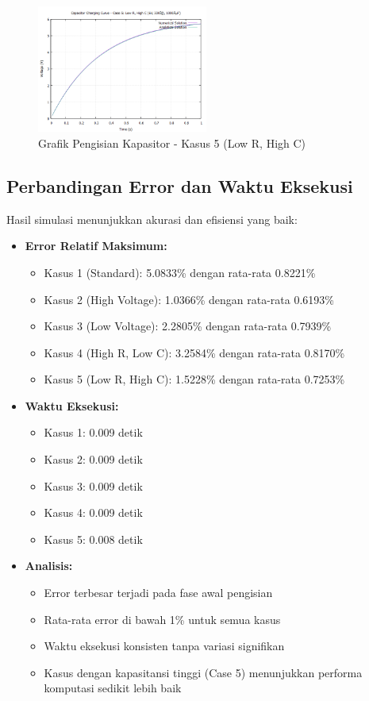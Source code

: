 \documentclass[conference]{IEEEtran}
\begin{document}
\begin{figure}[H]
    \centering
    \includegraphics[width=0.5\textwidth]{Grafik/Grafik5.png}
    \caption{Grafik Pengisian Kapasitor - Kasus 5 (Low R, High C)}
    \label{fig:case5}
\end{figure}

\subsection{Perbandingan Error dan Waktu Eksekusi}
Hasil simulasi menunjukkan akurasi dan efisiensi yang baik:
\begin{itemize}
\item \textbf{Error Relatif Maksimum:}
  \begin{itemize}
  \item Kasus 1 (Standard): 5.0833\% dengan rata-rata 0.8221\%
  \item Kasus 2 (High Voltage): 1.0366\% dengan rata-rata 0.6193\%
  \item Kasus 3 (Low Voltage): 2.2805\% dengan rata-rata 0.7939\%
  \item Kasus 4 (High R, Low C): 3.2584\% dengan rata-rata 0.8170\%
  \item Kasus 5 (Low R, High C): 1.5228\% dengan rata-rata 0.7253\%
  \end{itemize}

\item \textbf{Waktu Eksekusi:}
  \begin{itemize}
  \item Kasus 1: 0.009 detik
  \item Kasus 2: 0.009 detik
  \item Kasus 3: 0.009 detik
  \item Kasus 4: 0.009 detik
  \item Kasus 5: 0.008 detik
  \end{itemize}

\item \textbf{Analisis:}
  \begin{itemize}
  \item Error terbesar terjadi pada fase awal pengisian
  \item Rata-rata error di bawah 1\% untuk semua kasus
  \item Waktu eksekusi konsisten tanpa variasi signifikan
  \item Kasus dengan kapasitansi tinggi (Case 5) menunjukkan performa komputasi sedikit lebih baik
  \end{itemize}
\end{itemize}
\end{document}
